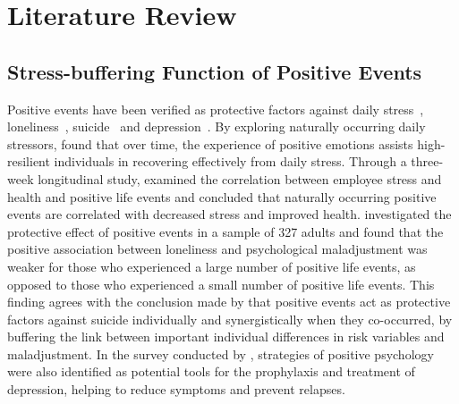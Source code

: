 \documentclass[5p,times,numbers,authoryear]{elsarticle}
\begin{document}
\section{Literature Review}
\label{sec:related}
\subsection{Stress-buffering Function of Positive Events}
Positive events have been verified as protective factors against daily stress~\citep{Ong2006Psychological,Bono2013Building}, loneliness~\citep{Chang2015Loneliness}, suicide~\citep{Evan2014Social} and depression~\citep{Santos2013The}.
By exploring naturally occurring daily stressors, \citep{Ong2006Psychological} found that over time, the experience of positive emotions assists high-resilient individuals in recovering effectively from daily stress.
Through a three-week longitudinal study, \citep{Bono2013Building} examined the correlation between employee stress and health and positive life events and concluded that naturally occurring positive events are correlated with decreased stress and improved health.
\citep{Chang2015Loneliness} investigated the protective effect of positive events in a sample of 327 adults and found that the positive association between loneliness and psychological maladjustment was weaker for those who experienced a large number of positive life events, as opposed to those who experienced a small number of positive life events.
This finding agrees with the conclusion made by \citep{Evan2014Social} that positive events act as protective factors against suicide individually and synergistically when they co-occurred,
by buffering the link between important individual differences in risk variables and maladjustment.
In the survey conducted by \citep{Santos2013The}, strategies of positive psychology were also identified as potential tools for the prophylaxis and treatment of depression, helping to reduce symptoms and prevent relapses.
\end{document}
